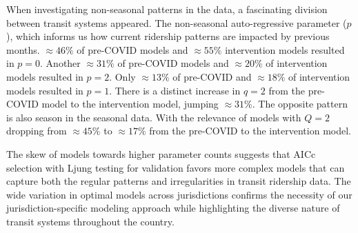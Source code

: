 \documentclass[11pt]{article}
\begin{document}
When investigating non-seasonal patterns in the data, a fascinating division between transit systems appeared. The non-seasonal auto-regressive parameter ($p$), which informs us how current ridership patterns are impacted by previous months. $\approx46\%$ of pre-COVID models and $\approx55\%$ intervention models resulted in $p = 0$. Another $\approx31\%$ of pre-COVID models and $\approx20\%$ of intervention models resulted in $p = 2$. Only $\approx 13\%$ of pre-COVID and $\approx18\%$ of intervention models resulted in $p=1$. There is a distinct increase in $q=2$ from the pre-COVID model to the intervention model, jumping $\approx31\%$. The opposite pattern is also season in the seasonal data. With the relevance of models with $Q=2$ dropping from $\approx 45\%$ to $\approx17\%$ from the pre-COVID to the intervention model.

The skew of models towards higher parameter counts suggests that AICc selection with Ljung testing for validation favors more complex models that can capture both the regular patterns and irregularities in transit ridership data. The wide variation in optimal models across jurisdictions confirms the necessity of our jurisdiction-specific modeling approach while highlighting the diverse nature of transit systems throughout the country.
\end{document}
